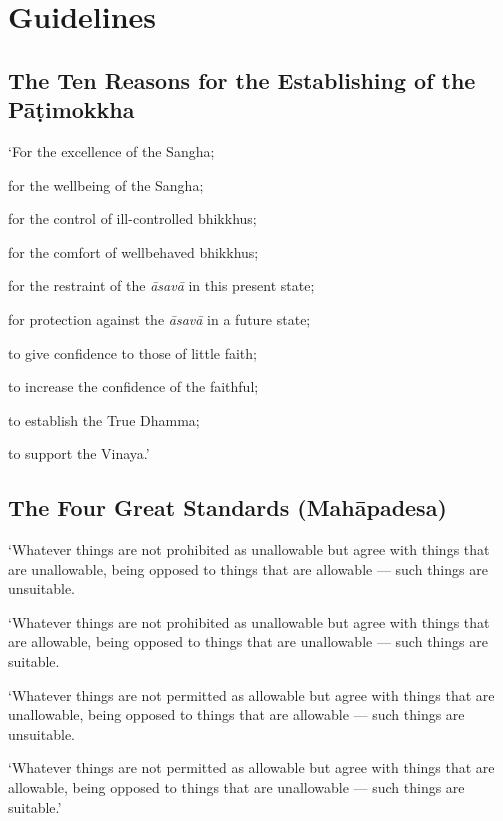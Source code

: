 \chapter{Guidelines}

\section[Establishing of the Pāṭimokkha]{The Ten Reasons for the Establishing of the Pāṭimokkha}

\begin{packedenumerate}

\item `For the excellence of the Sangha;
\item for the wellbeing of the Sangha;
\item for the control of ill-controlled bhikkhus;
\item for the comfort of wellbehaved bhikkhus;
\item for the restraint of the \emph{āsavā} in this present state;
\item for protection against the \emph{āsavā} in a future state;
\item to give confidence to those of little faith;
\item to increase the confidence of the faithful;
\item to establish the True Dhamma;
\item to support the Vinaya.'

\end{packedenumerate}


\section{The Four Great Standards (Mahāpadesa)}

`Whatever things are not prohibited as unallowable but agree with things that
are unallowable, being opposed to things that are allowable — such things are
unsuitable.

`Whatever things are not prohibited as unallowable but agree with things that
are allowable, being opposed to things that are unallowable — such things are
suitable.

`Whatever things are not permitted as allowable but agree with things that are
unallowable, being opposed to things that are allowable — such things are
unsuitable.

`Whatever things are not permitted as allowable but agree with things that are
allowable, being opposed to things that are unallowable — such things are
suitable.'

